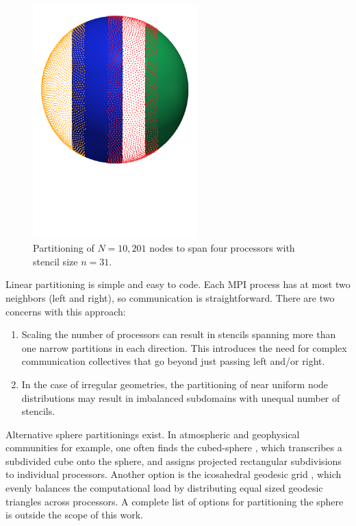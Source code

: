 \documentclass{report}
\begin{document}
\begin{figure}[ht!]
\begin{center}
\includegraphics[width=2.5in]{../figures/paper1/figures/vortex_rollup/4procs_N10K_n31.pdf}
\caption{Partitioning of $N=10,201$ nodes to span four processors with stencil size $n=31$. }
\label{fig:decomposed_sphere}
\end{center}
\end{figure}

Linear partitioning is simple and easy to code. Each MPI process has at most two neighbors (left and right), so communication is straightforward. There are two concerns with this approach: 
\begin{enumerate} 
\item Scaling the number of processors can result in stencils spanning more than one narrow partitions in each direction. This introduces the need for complex communication collectives that go beyond just passing left and/or right.
\item In the case of irregular geometries, the partitioning of near uniform node distributions may result in imbalanced subdomains with unequal number of stencils.
\end{enumerate}

Alternative sphere partitionings exist. In atmospheric and geophysical communities for example, one often finds the cubed-sphere \cite{Ivan2011, Katta2012}, which transcribes a subdivided cube onto the sphere, and assigns projected rectangular subdivisions to individual processors. Another option is the icosahedral geodesic grid \cite{Randall2002}, which evenly balances the computational load by distributing equal sized geodesic triangles across processors. A complete list of options for partitioning the sphere is outside the scope of this work. %
\end{document}
